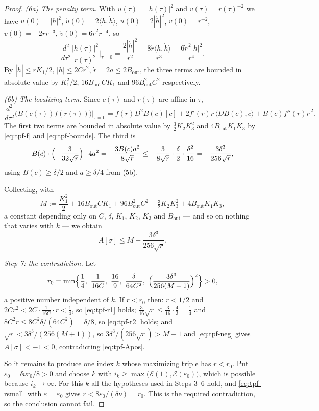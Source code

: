 \begin{proof}
\emph{(6a) The penalty term.} With $u(\tau)=|h(\tau)|^2$ and
$v(\tau)=r(\tau)^{-2}$ we have $u(0)=|h|^2$, $\dot u(0)=2\langle h,\dot
h\rangle$, $\ddot u(0)=2|\dot h|^2$, $v(0)=r^{-2}$, $\dot v(0)=-2\dot r r^{-3}$,
$\ddot v(0)=6\dot r^2r^{-4}$, so
\[
  \frac{d^2}{d\tau^2}\frac{|h(\tau)|^2}{r(\tau)^2}\Big|_{\tau=0}
   =\frac{2|\dot h|^2}{r^2}-\frac{8\dot r\langle h,\dot h\rangle}{r^3}
     +\frac{6\dot r^{\,2}|h|^2}{r^4}.
\]
By $|\dot h|\le rK_1/2$, $|h|\le2Cr^2$, $\dot r=2a\le2B_{\mathrm{out}}$, the
three terms are bounded in absolute value by $K_1^2/2$, $16B_{\mathrm{out}}CK_1$
and $96B_{\mathrm{out}}^2C^2$ respectively.

\emph{(6b) The localizing term.} Since $c(\tau)$ and $r(\tau)$ are affine in
$\tau$,
\[
  \frac{d^2}{d\tau^2}\bigl(B(c(\tau))f(r(\tau))\bigr)\Big|_{\tau=0}
   =f(r)D^2B(c)[\dot c]+2f'(r)\dot r\,\langle DB(c),\dot c\rangle
     +B(c)f''(r)\dot r^{\,2}.
\]
The first two terms are bounded in absolute value by $\tfrac32K_2K_3^2$ and
$4B_{\mathrm{out}}K_1K_3$ by \eqref{eq:tpf-f} and \eqref{eq:tpf-bounds}. The
third is
\[
  B(c)\cdot\Bigl(-\frac3{32\sqrt r}\Bigr)\cdot4a^2
   =-\frac{3B(c)a^2}{8\sqrt r}\le-\frac{3}{8\sqrt r}\cdot\frac\delta2
      \cdot\frac{\delta^2}{16}=-\frac{3\delta^3}{256\sqrt r},
\]
using $B(c)\ge\delta/2$ and $a\ge\delta/4$ from (5b).

Collecting, with
\[
  M:=\frac{K_1^2}2+16B_{\mathrm{out}}CK_1+96B_{\mathrm{out}}^2C^2
    +\tfrac32K_2K_3^2+4B_{\mathrm{out}}K_1K_3 ,
\]
a constant depending only on $C$, $\delta$, $K_1$, $K_2$, $K_3$ and
$B_{\mathrm{out}}$ --- and so on nothing that varies with $k$ --- we obtain
\begin{equation}\label{eq:tpf-neg}
  A[\sigma]\le M-\frac{3\delta^3}{256\sqrt r} .
\end{equation}

\emph{Step 7: the contradiction.}
Let
\[
  r_0=\min\Bigl\{\frac14,\ \frac1{16C},\ \frac{16}{9},\
    \frac{\delta}{64C^2},\
    \Bigl(\frac{3\delta^3}{256(M+1)}\Bigr)^{2}\Bigr\}>0 ,
\]
a positive number independent of $k$. If $r<r_0$ then: $r<1/2$ and
$2Cr^2<2C\cdot\frac1{16C}\cdot r<\frac14$, so \eqref{eq:tpf-r1} holds;
$\tfrac3{16}\sqrt r\le\tfrac3{16}\cdot\tfrac43=\tfrac14$ and
$8C^2r\le8C^2\delta/(64C^2)=\delta/8$, so \eqref{eq:tpf-r2} holds; and
$\sqrt r<3\delta^3/(256(M+1))$, so
$3\delta^3/(256\sqrt r)>M+1$ and \eqref{eq:tpf-neg} gives $A[\sigma]<-1<0$,
contradicting \eqref{eq:tpf-Apos}.

So it remains to produce one index $k$ whose maximizing triple has $r<r_0$. Put
$\varepsilon_0=\delta\nu r_0/8>0$ and choose $k$ with
$i_k\ge\max\bigl(\mathcal E(1),\mathcal E(\varepsilon_0)\bigr)$, which is
possible because $i_k\to\infty$. For this $k$ all the hypotheses used in Steps
3--6 hold, and \eqref{eq:tpf-rsmall} with $\varepsilon=\varepsilon_0$ gives
$r<8\varepsilon_0/(\delta\nu)=r_0$. This is the required contradiction, so the
conclusion cannot fail.
\end{proof}
